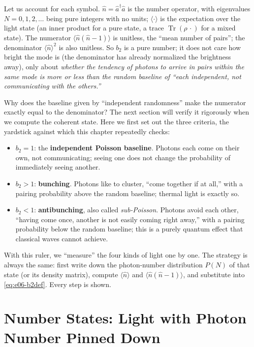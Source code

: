 Let us account for each symbol. \(\hat n=\hat a^\dagger\hat a\) is the number operator, with eigenvalues \(N=0,1,2,\dots\) being pure integers with no units; \(\langle\cdot\rangle\) is the expectation over the light state (an inner product for a pure state, a trace \(\operatorname{Tr}(\rho\,\cdot)\) for a mixed state). The numerator \(\langle\hat n(\hat n-1)\rangle\) is unitless, the ``mean number of pairs''; the denominator \(\langle\hat n\rangle^2\) is also unitless. So \(b_2\) is a pure number; it does not care how bright the mode is (the denominator has already normalized the brightness away), only about \emph{whether the tendency of photons to arrive in pairs within the same mode is more or less than the random baseline of ``each independent, not communicating with the others.''}

Why does the baseline given by ``independent randomness'' make the numerator exactly equal to the denominator? The next section will verify it rigorously when we compute the coherent state. Here we first set out the three criteria, the yardstick against which this chapter repeatedly checks:
\begin{itemize}
  \item \(b_2=1\): the \textbf{independent Poisson baseline}. Photons each come on their own, not communicating; seeing one does not change the probability of immediately seeing another.
  \item \(b_2>1\): \textbf{bunching}. Photons like to cluster, ``come together if at all,'' with a pairing probability above the random baseline; thermal light is exactly so.
  \item \(b_2<1\): \textbf{antibunching}, also called \emph{sub-Poisson}. Photons avoid each other, ``having come once, another is not easily coming right away,'' with a pairing probability below the random baseline; this is a purely quantum effect that classical waves cannot achieve.
\end{itemize}

With this ruler, we ``measure'' the four kinds of light one by one. The strategy is always the same: first write down the photon-number distribution \(P(N)\) of that state (or its density matrix), compute \(\langle\hat n\rangle\) and \(\langle\hat n(\hat n-1)\rangle\), and substitute into \eqref{eq:e06-b2def}. Every step is shown.

\section{Number States: Light with Photon Number Pinned Down}
\label{sec:e06-fock}

